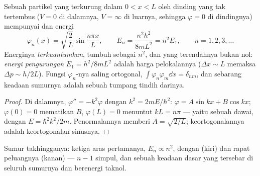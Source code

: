 \begin{proposition}\label{prop:b2:potential-wells-tunneling:infinite}
Sebuah partikel yang terkurung dalam $0 < x < L$ oleh dinding yang tak tertembus ($V = 0$
di dalamnya, $V = \infty$ di luarnya, sehingga $\varphi = 0$ di dindingnya) mempunyai
 dan energi
\[
\varphi_n(x) = \sqrt{\frac{2}{L}}\sin\frac{n\pi x}{L}, \qquad
E_n = \frac{n^2h^2}{8mL^2} = n^2E_1, \qquad n = 1, 2, 3, \dots
\]
Energinya \emph{terkuantumkan}, tumbuh
sebagai $n^2$, dan yang terendahnya bukan nol: \emph{energi
pengurungan} $E_1 = h^2/8mL^2$ adalah harga
pelokalannya ($\Delta x \sim L$ memaksa $\Delta p \sim h/2L$). Fungsi
$\varphi_n$-nya saling ortogonal, $\int\varphi_n\varphi_m\dd x = \delta_{nm}$, dan sebarang
keadaan sumurnya adalah sebuah tumpang tindih darinya.
\end{proposition}

\begin{proof}
Di dalamnya, $\varphi'' = -k^2\varphi$ dengan $k^2 = 2mE/\hbar^2$: $\varphi = A\sin kx
+ B\cos kx$; $\varphi(0) = 0$ mematikan $B$, $\varphi(L) = 0$ menuntut $kL = n\pi$
--- yaitu  sebuah dawai, dengan $E = \hbar^2k^2/2m$.
Penormalannya memberi $A = \sqrt{2/L}$; keortogonalannya adalah keortogonalan
sinusnya.
\end{proof}

\begin{omfigure}

{\small Sumur takhingganya: ketiga aras pertamanya, $E_n \propto n^2$,
dengan  (kiri) dan rapat peluangnya (kanan) ---
$n - 1$ simpul, dan sebuah keadaan dasar yang tersebar di seluruh sumurnya dan
berenergi taknol.}
\end{omfigure}


